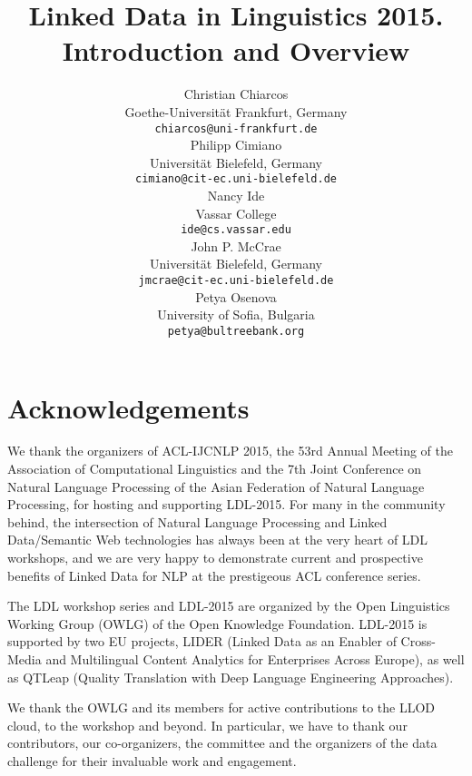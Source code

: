 \documentclass[11pt]{article}
\title{Linked Data in Linguistics 2015. Introduction and Overview}
\author{Christian Chiarcos \\
  Goethe-Universität Frankfurt, Germany\\
  {\tt chiarcos@uni-frankfurt.de} \\
  \And 
  Philipp Cimiano\\
  Universität Bielefeld, Germany\\
  {\tt cimiano@cit-ec.uni-bielefeld.de}\\ 
  \And
  Nancy Ide\\
  Vassar College\\
  {\tt ide@cs.vassar.edu}\\
  \And
  John P. McCrae \\
  Universität Bielefeld, Germany\\
  {\tt jmcrae@cit-ec.uni-bielefeld.de}\\ 
  \And
  Petya Osenova\\
  University of Sofia, Bulgaria\\
  {\tt petya@bultreebank.org}
}
\date{}
\begin{document}
\maketitleabstract





\section*{Acknowledgements}

We thank the organizers of ACL-IJCNLP 2015, the 53rd Annual Meeting of the Association of Computational Linguistics and the 7th Joint Conference on Natural Language Processing of the Asian Federation of Natural Language Processing, for hosting and supporting LDL-2015. 
For many in the community behind, the intersection of Natural Language Processing and Linked Data/Semantic Web technologies has always been at the very heart of LDL workshops, and we are very happy to demonstrate current and prospective benefits of Linked Data for NLP at the prestigeous ACL conference series.

The LDL workshop series and LDL-2015 are organized by the Open Linguistics Working Group (OWLG) of the Open Knowledge Foundation. LDL-2015 is supported by two EU projects, LIDER (Linked Data as an Enabler of Cross-Media and Multilingual Content Analytics for Enterprises Across Europe), as well as QTLeap (Quality Translation with Deep Language Engineering Approaches).

We thank the OWLG and its members for active contributions to the LLOD cloud, to the workshop and beyond. In particular, we have to thank our contributors, our co-organizers, the committee and the organizers of the data challenge for their invaluable work and engagement.




\newpage
\end{document}
